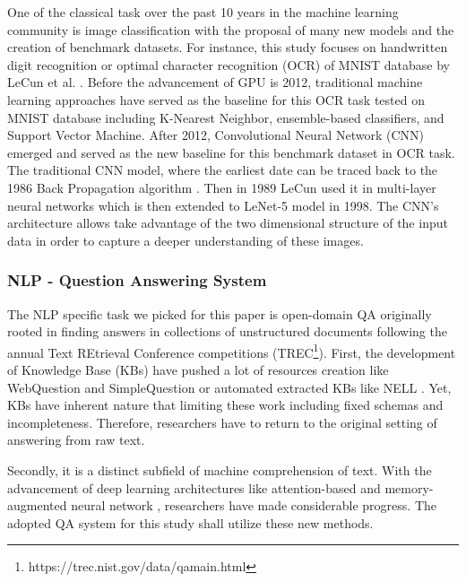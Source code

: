 One of the classical task over the past 10 years in the machine learning community is image classification with the proposal of many new models and the creation of benchmark datasets. For instance, this study focuses on handwritten digit recognition or optimal character recognition (OCR) of MNIST database by LeCun et al. \cite{1989Lecun}. Before the advancement of GPU is 2012, traditional machine learning approaches have served as the baseline for this OCR task tested on MNIST database including K-Nearest Neighbor, ensemble-based classifiers, and Support Vector Machine. After 2012, Convolutional Neural Network (CNN) emerged and served as the new baseline for this benchmark dataset in OCR task.
The traditional CNN model, where the earliest date can be traced back
to the 1986 Back Propagation algorithm \cite{BP}. Then in 1989 LeCun used it
in multi-layer neural networks \cite{1989Lecun} which is then extended to LeNet-5 model in 1998. The CNN's architecture allows take advantage of the
two dimensional structure of the input data in order to capture a deeper understanding of these images.






\vspace{2pt}
\subsubsection{NLP - Question Answering System}

The NLP specific task we picked for this paper is open-domain QA originally rooted in finding answers in collections of unstructured documents following the annual Text REtrieval Conference competitions (TREC\footnote{https://trec.nist.gov/data/qamain.html}). First, the development of Knowledge Base (KBs) have pushed a lot of resources creation like WebQuestion \cite{webquestion} and SimpleQuestion \cite{simplequestion} or automated extracted KBs like NELL \cite{KBNELL}. Yet, KBs have inherent nature that limiting these work including fixed schemas and incompleteness. Therefore, researchers have to return to the original setting of answering from raw text. 



Secondly, it is a distinct subfield of machine comprehension of text. With the advancement of deep learning architectures like attention-based and memory-augmented neural network \cite{attention} \cite{attention2} \cite{attention3}, researchers have made considerable progress.  The adopted QA system  for this study shall utilize these new methods.


